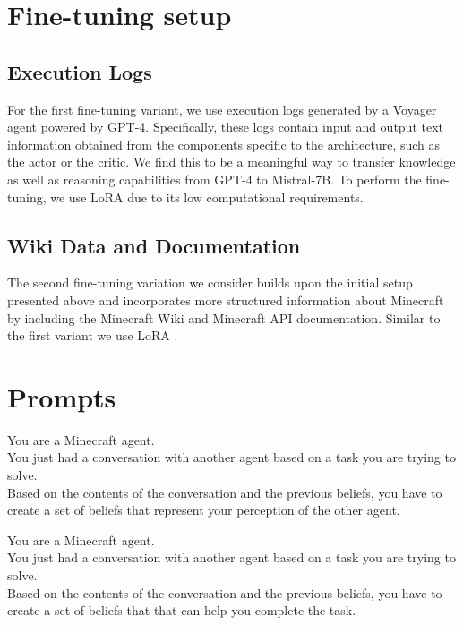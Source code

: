 \section{Fine-tuning setup}
\label{appendix:fine}
\subsection{Execution Logs}
For the first fine-tuning variant, we use execution logs generated by a Voyager agent powered by GPT-4. Specifically, these logs contain input and output text information obtained from the components specific to the architecture, such as the actor or the critic. We find this to be a meaningful way to transfer knowledge as well as reasoning capabilities from GPT-4 to Mistral-7B. To perform the fine-tuning, we use LoRA \citep{hu2021lora} due to its low computational requirements. 

\subsection{Wiki Data and Documentation}

The second fine-tuning variation we consider builds upon the initial setup presented above and incorporates more structured information about Minecraft by including the Minecraft Wiki \citep{fan2022minedojo} and Minecraft API documentation. Similar to the first variant we use LoRA \citep{hu2021lora}.

\section{Prompts}
\label{appendix:prompts}

\begin{tcolorbox}[title=Prompt for updating partner beliefs, label=box:response-semantic-1]
You are a Minecraft agent. \\ 

You just had a conversation with another agent based on a task you are trying to solve. \\

Based on the contents of the conversation and the previous beliefs, you have to create a set of beliefs that represent your perception of the other agent.
\end{tcolorbox}

\begin{tcolorbox}[title=Prompt for creating interaction beliefs, label=box:response-semantic-1]
You are a Minecraft agent. \\

You just had a conversation with another agent based on a task you are trying to solve. \\

Based on the contents of the conversation and the previous beliefs, you have to create a set of beliefs that that can help you complete the task.
\end{tcolorbox}

